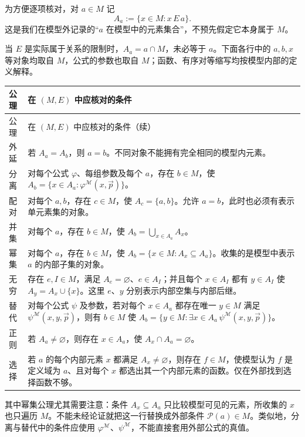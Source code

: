 \documentclass[lang=cn,a4paper,fontset=none,zihao=false,10pt,openany,twoside]{beautybook}
\numberwithin{algorithm}{chapter}
\newcommand{\Pow}{\mathcal P}
\begin{document}
为方便逐项核对，对 $a\in M$ 记
\[
 A_a:=\{x\in M:x\,E\,a\}.
\]
这是我们在模型外记录的“$a$ 在模型中的元素集合”，不预先假定它本身属于 $M$。

当 $E$ 是实际属于关系的限制时，$A_a=a\cap M$，未必等于 $a$。下面各行中的 $a,b,x$ 等对象均取自 $M$，公式的参数也取自 $M$；函数、有序对等缩写均按模型内部的定义解释。

\begingroup
\small{}
\begin{longtable}{@{}p{}p{}@{}}
\toprule
公理 & 在 $(M,E)$ 中应核对的条件\\
\midrule
\endfirsthead
\toprule
公理 & 在 $(M,E)$ 中应核对的条件（续）\\
\midrule
\endhead
\bottomrule
\endfoot
外延 & 若 $A_a=A_b$，则 $a=b$。不同对象不能拥有完全相同的模型内元素。\\[4pt]
分离 & 对每个公式 $\varphi$、每组参数及每个 $a$，存在 $b\in M$，使 $A_b=\{x\in A_a:\varphi^{\mathcal M}(x,\vec p)\}$。\\[4pt]
配对 & 对每个 $a,b$，存在 $c\in M$，使 $A_c=\{a,b\}$。允许 $a=b$，此时也必须有表示单元素集的对象。\\[4pt]
并集 & 对每个 $a$，存在 $b\in M$，使 $A_b=\bigcup_{x\in A_a}A_x$。\\[4pt]
幂集 & 对每个 $a$，存在 $b\in M$，使 $A_b=\{x\in M:A_x\subseteq A_a\}$。收集的是模型中表示 $a$ 的内部子集的对象。\\[4pt]
无穷 & 存在 $e,I\in M$，满足 $A_e=\varnothing$、$e\in A_I$；并且每个 $x\in A_I$ 都有 $y\in A_I$ 使 $A_y=A_x\cup\{x\}$。这里 $e$、$y$ 分别表示内部空集与内部后继。\\[4pt]
替代 & 对每个公式 $\psi$ 及参数，若对每个 $x\in A_a$ 都存在唯一 $y\in M$ 满足 $\psi^{\mathcal M}(x,y,\vec p)$，则有 $b\in M$ 使 $A_b=\{y\in M:\exists x\in A_a\,\psi^{\mathcal M}(x,y,\vec p)\}$。\\[4pt]
正则 & 若 $A_a\ne\varnothing$，则存在 $x\in A_a$，使 $A_x\cap A_a=\varnothing$。\\[4pt]
选择 & 若 $a$ 的每个内部元素 $x$ 都满足 $A_x\ne\varnothing$，则存在 $f\in M$，使模型认为 $f$ 是定义域为 $a$、且对每个 $x$ 都选出其一个内部元素的函数。仅在外部找到选择函数不够。\\
\end{longtable}
\endgroup

其中幂集公理尤其需要注意：条件 $A_x\subseteq A_a$ 只比较模型可见的元素，所收集的 $x$ 也只遍历 $M$。不能未经论证就把这一行替换成外部条件 $\Pow(a)\in M$。类似地，分离与替代中的条件应使用 $\varphi^{\mathcal M}$、$\psi^{\mathcal M}$，不能直接套用外部公式的真值。
\end{document}
